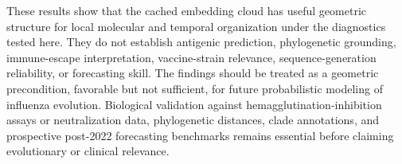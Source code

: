 \documentclass[11pt]{article}
\begin{document}
These results show that the cached embedding cloud has useful geometric structure for local molecular and temporal organization under the diagnostics tested here. They do not establish antigenic prediction, phylogenetic grounding, immune-escape interpretation, vaccine-strain relevance, sequence-generation reliability, or forecasting skill. The findings should be treated as a geometric precondition, favorable but not sufficient, for future probabilistic modeling of influenza evolution. Biological validation against hemagglutination-inhibition assays or neutralization data, phylogenetic distances, clade annotations, and prospective post-2022 forecasting benchmarks remains essential before claiming evolutionary or clinical relevance.



\end{document}
